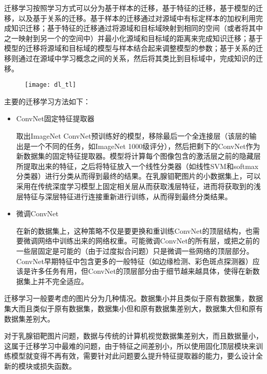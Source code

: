 迁移学习按照学习方式可以分为基于样本的迁移，基于特征的迁移，基于模型的迁移，以及基于关系的迁移。基于样本的迁移通过对源域中有标定样本的加权利用完成知识迁移；基于特征的迁移通过将源域和目标域映射到相同的空间（或者将其中之一映射到另一个的空间中）并最小化源域和目标域的距离来完成知识迁移；基于模型的迁移将源域和目标域的模型与样本结合起来调整模型的参数；基于关系的迁移则通过在源域中学习概念之间的关系，然后将其类比到目标域中，完成知识的迁移。
	\begin{figure}[!htbp]
    \centering
    \texttt{[image: dl\_tl]}
    \label{fig:dl_tl}
	\end{figure}
	主要的迁移学习方法如下：
	\begin{itemize}
		\item ConvNet固定特征提取器
		
		取出ImageNet ConvNet预训练好的模型，移除最后一个全连接层（该层的输出是一个不同的任务，如ImageNet 1000级评分），然后把剩下的ConvNet作为新数据集的固定特征提取器。模型将计算每个图像包含的激活层之前的隐藏层所提取出来的特征，之后将特征放入一个线性分类器（如线性SVM和softmax分类器）进行分类从而得到最终的结果。在乳腺钼靶图片的小数据集上，可以采用在传统深度学习模型上固定相关层从而获取浅层特征，进而将获取到的浅层特征与深层特征进行连接重新进行训练，从而得到最终分类结果。
		
		\item 微调ConvNet
		
		在新的数据集上，这种策略不仅是要更换和重训练ConvNet的顶层结构，也需要微调网络中训练出来的网络权重。可能微调ConvNet的所有层，或把之前的一些层固定是可能的（由于过度拟合问题）只是微调一些网络的顶层部分。ConvNet早期特征中包含更多的一般特征（如边缘检测、彩色斑点探测器）应该是许多任务有用，但ConvNet的顶层部分由于细节越来越具体，使得在新数据集上并不完全适应。
		
	\end{itemize}

迁移学习一般要考虑的图片分为几种情况。数据集小并且类似于原有数据集，数据集大而且类似于原有数据集，数据集小但和原有数据集差别大，数据集大但和原有数据集差别大。

对于乳腺钼靶图片问题，数据与传统的计算机视觉数据集差别大，而且数据量小，这属于迁移学习中最难的问题，由于特征之间差别小，所以使用固化顶层模块来训练模型就变得不再有效，需要针对此问题要么提升特征提取器的能力，要么设计全新的模块或损失函数。 

